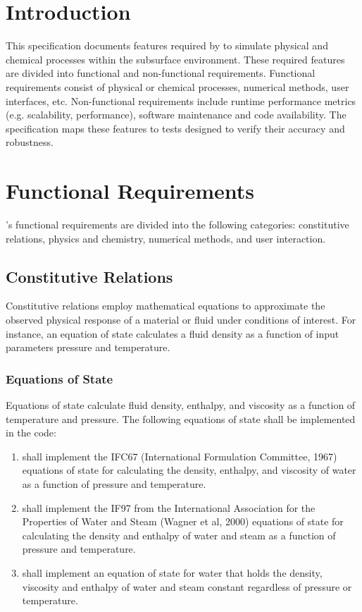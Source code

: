\section{Introduction}
This specification documents features required by \pft to simulate physical and chemical processes within the subsurface environment. These required features are divided into functional and non-functional requirements. Functional requirements consist of physical or chemical processes, numerical methods, user interfaces, etc.  Non-functional requirements include runtime performance metrics (e.g. scalability,  performance), software maintenance and code availability. The specification maps these features to tests designed to verify their accuracy and robustness.

\section{Functional Requirements}
\pft’s functional requirements are divided into the following categories: constitutive relations, physics and chemistry, numerical methods, and user interaction.
\subsection{Constitutive Relations}

Constitutive relations employ mathematical equations to approximate the observed physical response of a material or fluid under conditions of interest. For instance, an equation of state calculates a fluid density as a function of input parameters pressure and temperature.

\subsubsection{Equations of State}
Equations of state calculate fluid density, enthalpy, and viscosity as a function of temperature and pressure. The following equations of state shall be implemented in the code:
\begin{enumerate}
	\item \label{eos_water_ifc67} \pft shall implement the IFC67 (International Formulation Committee, 1967) equations of state for calculating the density, enthalpy, and viscosity of water as a function of pressure and temperature.
	\item \label{eos_water_eos_water_if97} \pft shall implement the IF97 from the International Association for the Properties of Water and Steam (Wagner et al, 2000) equations of state for calculating the density and enthalpy of water and steam as a function of pressure and temperature.
	\item \label{eos_water_constant} \pft shall implement an equation of state for water that holds the density, viscosity and enthalpy of water and steam constant regardless of pressure or temperature.
\end{enumerate}

